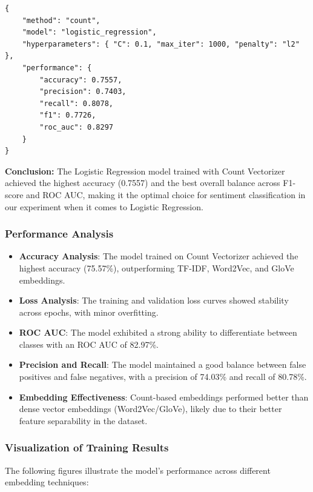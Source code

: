 \begin{verbatim}
{
    "method": "count",
    "model": "logistic_regression",
    "hyperparameters": { "C": 0.1, "max_iter": 1000, "penalty": "l2" },
    "performance": {
        "accuracy": 0.7557,
        "precision": 0.7403,
        "recall": 0.8078,
        "f1": 0.7726,
        "roc_auc": 0.8297
    }
}
\end{verbatim}

\textbf{Conclusion:} The Logistic Regression model trained with Count Vectorizer achieved the highest accuracy (0.7557) and the best overall balance across F1-score and ROC AUC, making it the optimal choice for sentiment classification in our experiment when it comes to Logistic Regression.

\subsubsection{Performance Analysis}
\begin{itemize}
    \item \textbf{Accuracy Analysis}: The model trained on Count Vectorizer achieved the highest accuracy (75.57\%), outperforming TF-IDF, Word2Vec, and GloVe embeddings.
    \item \textbf{Loss Analysis}: The training and validation loss curves showed stability across epochs, with minor overfitting.
    \item \textbf{ROC AUC}: The model exhibited a strong ability to differentiate between classes with an ROC AUC of 82.97\%.
    \item \textbf{Precision and Recall}: The model maintained a good balance between false positives and false negatives, with a precision of 74.03\% and recall of 80.78\%.
    \item \textbf{Embedding Effectiveness}: Count-based embeddings performed better than dense vector embeddings (Word2Vec/GloVe), likely due to their better feature separability in the dataset.
\end{itemize}

\subsubsection{Visualization of Training Results}
The following figures illustrate the model’s performance across different embedding techniques:

